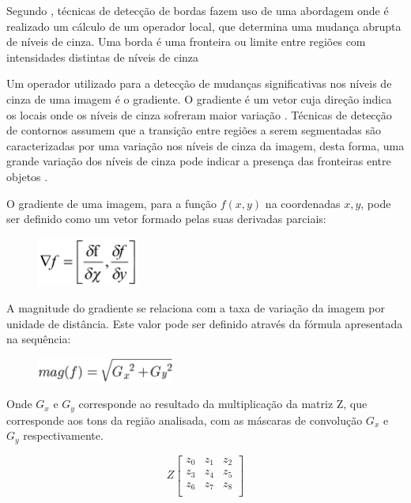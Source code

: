 \documentclass[
	12pt,				%
	oneside,			%
	a4paper,			%
	english,			%
	french,				%
	spanish,			%
	brazil,				%
	]{abntex2}
\begin{document}
Segundo \citet{pedriniSchwartz:2008}, técnicas de detecção de bordas fazem uso de uma abordagem onde é realizado um cálculo de um operador local, que determina uma mudança abrupta de níveis de cinza. Uma borda é uma fronteira ou limite entre regiões com intensidades distintas de níveis de cinza

Um operador utilizado para a detecção de mudanças significativas nos níveis de cinza de uma imagem é o gradiente. O gradiente é um vetor cuja direção indica os locais onde os níveis de cinza sofreram maior variação \cite{pedriniSchwartz:2008}. Técnicas de detecção de contornos assumem que a transição entre regiões a serem segmentadas são caracterizadas por uma variação nos níveis de cinza da imagem, desta forma, uma grande variação dos níveis de cinza pode indicar a presença das fronteiras entre objetos \cite{conciAzevedoLeta:2008}. 

O gradiente de uma imagem, para a função \(f(x,y)\) na coordenadas \(x,y\), pode ser definido como um vetor formado pelas suas derivadas parciais:

\begin{figure}[ht]
\centering
\includegraphics[width=0.3\textwidth]{imagens/gradiente.png}

\end{figure}

A magnitude do gradiente se relaciona com a taxa de variação da imagem por unidade de distância. Este valor pode ser definido através da fórmula apresentada na sequência:

\begin{figure}[ht]
\centering
\includegraphics[width=0.4\textwidth]{imagens/magnitude.png}
\end{figure}


Onde \(G_x\) e \(G_y\) corresponde ao resultado da multiplicação da matriz Z, que corresponde aos tons da região analisada, com as máscaras de convolução \(G_x\) e \(G_y\) respectivamente.


\[
Z
\begin{bmatrix}
    z_0 & z_1 & z_2    \\
	z_3 & z_4 & z_5    \\  
	z_6 & z_7 & z_8    \\  
\end{bmatrix} 
\]
\end{document}
